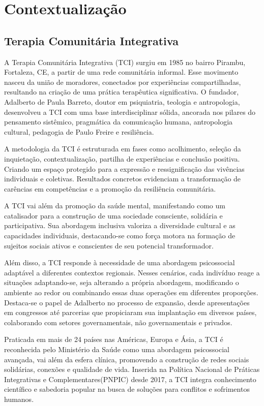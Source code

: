 \part{Contextualização}

\chapter{Terapia Comunitária Integrativa}
A Terapia Comunitária Integrativa (TCI) surgiu em 1985 no bairro Pirambu, Fortaleza, CE, a partir de uma rede comunitária informal. Esse movimento nasceu da união de moradores, conectados por experiências compartilhadas, resultando na criação de uma prática terapêutica significativa. O fundador, Adalberto de Paula Barreto, doutor em psiquiatria, teologia e antropologia, desenvolveu a TCI com uma base interdisciplinar sólida, ancorada nos pilares do pensamento sistêmico, pragmática da comunicação humana, antropologia cultural, pedagogia de Paulo Freire e resiliência.\cite{BARRETO}

A metodologia da TCI é estruturada em fases como acolhimento, seleção da inquietação, contextualização, partilha de experiências e conclusão positiva. Criando um espaço protegido para a expressão e ressignificação das vivências individuais e coletivas. Resultados concretos evidenciam a transformação de carências em competências e a promoção da resiliência comunitária. \cite{SILVA}

A TCI vai além da promoção da saúde mental, manifestando como um catalisador para a construção de uma sociedade consciente, solidária e participativa. Sua abordagem inclusiva valoriza a diversidade cultural e as capacidades individuais, destacando-se como força motora na formação de sujeitos sociais ativos e conscientes de seu potencial transformador.\cite{BARRETO}

Além disso, a TCI responde à necessidade de uma abordagem psicossocial adaptável a diferentes contextos regionais. Nesses cenários, cada indivíduo reage a situações adaptando-se, seja alterando a própria abordagem, modificando o ambiente ao redor ou combinando essas duas operações em diferentes proporções.\cite{DANTAS} Destaca-se o papel de Adalberto no processo de expansão, desde apresentações em congressos até parcerias que propiciaram sua implantação em diversos países, colaborando com setores governamentais, não governamentais e privados.\cite{GOMES}

Praticada em mais de 24 países nas Américas, Europa e Ásia, a TCI é reconhecida pelo Ministério da Saúde como uma abordagem psicossocial avançada, vai além da esfera clínica, promovendo a construção de redes sociais solidárias, conexões e qualidade de vida. Inserida na Política Nacional de Práticas Integrativas e Complementares(PNPIC) desde 2017, a TCI integra conhecimento científico e sabedoria popular na busca de soluções para conflitos e sofrimentos humanos.\cite{ABRATECOM}

